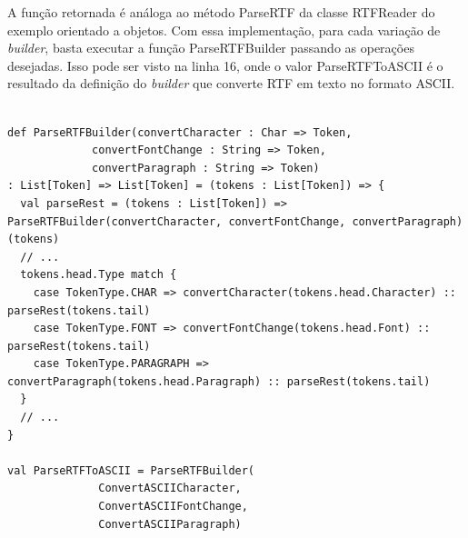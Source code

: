 A função retornada é análoga ao método 
ParseRTF da classe RTFReader do exemplo 
orientado a objetos. Com essa implementação, 
para cada variação de \textit{builder}, 
basta executar a função 
ParseRTFBuilder passando as operações 
desejadas. Isso pode ser visto na linha 16, 
onde o valor ParseRTFToASCII é o resultado 
da definição do \textit{builder} que converte 
RTF em texto no formato ASCII.

\begin{lstlisting}[caption={Builder Funcional},label=fpbuilder]
    
def ParseRTFBuilder(convertCharacter : Char => Token,
             convertFontChange : String => Token,
             convertParagraph : String => Token)
: List[Token] => List[Token] = (tokens : List[Token]) => {
  val parseRest = (tokens : List[Token]) => ParseRTFBuilder(convertCharacter, convertFontChange, convertParagraph)(tokens)
  // ...
  tokens.head.Type match {
    case TokenType.CHAR => convertCharacter(tokens.head.Character) :: parseRest(tokens.tail)
    case TokenType.FONT => convertFontChange(tokens.head.Font) :: parseRest(tokens.tail)
    case TokenType.PARAGRAPH => convertParagraph(tokens.head.Paragraph) :: parseRest(tokens.tail)
  }
  // ...
}

val ParseRTFToASCII = ParseRTFBuilder(
              ConvertASCIICharacter,
              ConvertASCIIFontChange,
              ConvertASCIIParagraph)
    
\end{lstlisting}